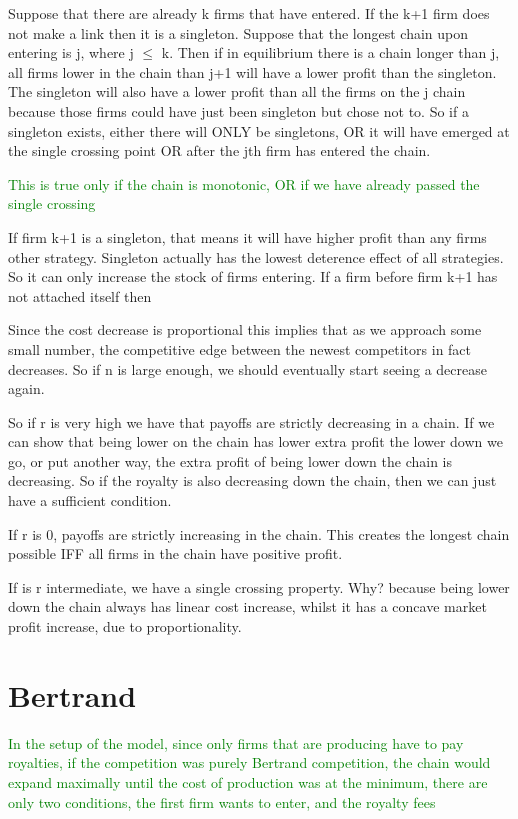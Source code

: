 \documentclass{article}
\begin{document}
Suppose that there are already k firms that have entered. If the k+1 firm does not make a link then it is a singleton. Suppose that the longest chain upon entering is j, where j $\leq$ k. Then if in equilibrium there is a chain longer than j, all firms lower in the chain than j+1 will have a lower profit than the singleton. The singleton will also have a lower profit than all the firms on the j chain because those firms could have just been singleton but chose not to. So if a singleton exists, either there will ONLY be singletons, OR it will have emerged at the single crossing point OR after the jth firm has entered the chain. 

\textcolor{green}{This is true only if the chain is monotonic, OR if we have already passed the single crossing}

If firm k+1 is a singleton, that means it will have higher profit than any firms other strategy. Singleton actually has the lowest deterence effect of all strategies. So it can only increase the stock of firms entering. If a firm before firm k+1 has not attached itself then 


Since the cost decrease is proportional this implies that as we approach some small number, the competitive edge between the newest competitors in fact decreases. So if n is large enough, we should eventually start seeing a decrease again. 

So if r is very high we have that payoffs are strictly decreasing in a chain. If we can show that being lower on the chain has lower extra profit the lower down we go, or put another way, the extra profit of being lower down the chain is decreasing. So if the royalty is also decreasing down the chain, then we can just have a sufficient condition. 

If r is 0, payoffs are strictly increasing in the chain. This creates the longest chain possible IFF all firms in the chain have positive profit.  

If is r intermediate, we have a single crossing property. Why? because being lower down the chain always has linear cost increase, whilst it has a concave market profit increase, due to proportionality. 

\section{Bertrand}

\textcolor{green}{In the setup of the model, since only firms that are producing have to pay royalties, if the competition was purely Bertrand competition, the chain would expand maximally until the cost of production was at the minimum, there are only two conditions, the first firm wants to enter, and the royalty fees}
\end{document}
